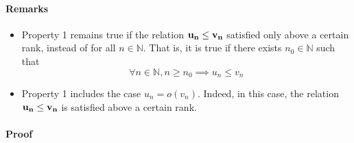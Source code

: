 \documentclass[notitlepage]{math}
\begin{document}
\paragraph{Remarks}
\begin{itemize}[label={--}]
    \item Property 1 remains true if the relation $\bf u_n \leq v_n$ satisfied only above a certain rank, instead of for all $n \in \mathbb{N}$.
    That is, it is true if there exists  $n_0 \in \mathbb{N}$ such that
    \[ \forall n \in \mathbb{N}, n \geq n_0 \implies u_n \leq v_n \]
    \item Property 1 includes the case $u_n = o(v_n)$.  Indeed, in this case, the relation $\bf u_n \leq v_n$ is satisfied above a certain rank.
\end{itemize}
\paragraph{Proof}
\end{document}
